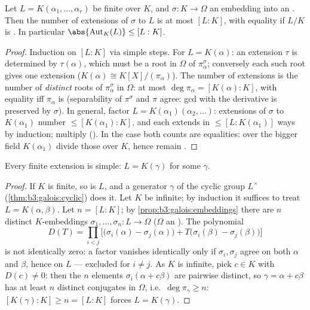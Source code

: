 \begin{proposition}\label{prop:b3:galois:embeddings}
Let $L = K(\alpha_1, \dots, \alpha_r)$ be finite over $K$, and
$\sigma \colon K \to \Omega$ an embedding into an . Then the number of extensions of $\sigma$ to $L$
is at most $[L:K]$, with equality if $L/K$ is . In
particular $\abs{\operatorname{Aut}_K(L)} \leq [L:K]$.
\end{proposition}

\begin{proof}
Induction on $[L:K]$ via simple steps. For $L = K(\alpha)$: an
extension $\tau$ is determined by $\tau(\alpha)$, which must be a
root in $\Omega$ of $\pi_\alpha^\sigma$; conversely each such
root gives one extension ($K(\alpha) \cong K[X]/(\pi_\alpha)$).
The number of extensions is the number of \emph{distinct} roots
of $\pi_\alpha^\sigma$ in $\Omega$: at most $\deg\pi_\alpha =
[K(\alpha):K]$, with equality iff $\pi_\alpha$ is 
(separability of $\pi^\sigma$ and $\pi$ agree: gcd with the
derivative is preserved by $\sigma$). In general, factor $L =
K(\alpha_1)(\alpha_2, \dots)$: extensions of $\sigma$ to
$K(\alpha_1)$ number $\leq [K(\alpha_1):K]$, and each extends in
$\leq [L : K(\alpha_1)]$ ways by induction; multiply (). In the  case both counts are equalities:  over the bigger field $K(\alpha_1)$ divide those
over $K$, hence remain .
\end{proof}

\begin{theorem}\label{thm:b3:galois:primitive}
Every finite \emph{} extension is simple: $L =
K(\gamma)$ for some $\gamma$.
\end{theorem}

\begin{proof}
If $K$ is finite, so is $L$, and a generator $\gamma$ of the
cyclic group $L^\times$ (\cref{thm:b3:galois:cyclic}) does it.
Let $K$ be infinite; by induction it suffices to treat $L =
K(\alpha, \beta)$. Let $n = [L:K]$; by
\cref{prop:b3:galois:embeddings} there are $n$ distinct
$K$-embeddings $\sigma_1, \dots, \sigma_n \colon L \to \Omega$
($\Omega$ an ). The polynomial
\[
D(T)=\prod_{i<j}\bigl[\bigl(\sigma_i(\alpha)-\sigma_j(\alpha)
\bigr) + T\bigl(\sigma_i(\beta) - \sigma_j(\beta)\bigr)\bigr]
\]
is not identically zero: a factor vanishes identically only if
$\sigma_i, \sigma_j$ agree on both $\alpha$ and $\beta$, hence on
$L$ --- excluded for $i \neq j$. As $K$ is infinite, pick $c \in
K$ with $D(c) \ne 0$: then the $n$ elements $\sigma_i(\alpha +
c\beta)$ are pairwise distinct, so $\gamma = \alpha + c\beta$
has at least $n$ distinct conjugates in $\Omega$, i.e.\
$\deg \pi_\gamma \geq n$: $[K(\gamma):K] \geq n = [L:K]$ forces
$L = K(\gamma)$.
\end{proof}

